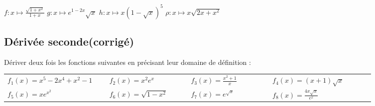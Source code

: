 \documentclass[oneside,12pt]{book}          %
\begin{document}
$f:x\mapsto\frac{\sqrt{1+x^2}}{1+x}$ \qquad $g:x\mapsto e^{1-2x}\sqrt{x}$ \qquad $h:x\mapsto x\left(1-\sqrt{x}\right)^5$ \qquad $\rho:x\mapsto x\sqrt{2x+x^2}$ 

\begin{sol}
\begin{minipage}{0.45\linewidth}
	
\end{minipage}\hfill
\begin{minipage}{0.45\linewidth}
	
\end{minipage}
\vspace{10pt}
\end{sol}



\subsection{Dérivée seconde\quad\small{(corrigé)}}
Dériver deux fois les fonctions suivantes en précisant leur domaine de définition :

\begin{tabular}{p{0.25\linewidth}p{0.2\linewidth}p{0.2\linewidth}p{0.25\linewidth}}
$f_1(x)=x^5-2x^4+x^2-1$ & $f_2(x)=x^2e^x$ & $f_3(x)=\frac{x^2+1}{x}$ & $f_4(x)=(x+1)\sqrt{x}$\\
$f_5(x)=xe^{x^2}$ & $f_6(x)=\sqrt{1-x^2}$ & $f_7(x)=e^{\sqrt{x}}$ & $f_8(x)=\frac{4x\sqrt{x}}{e^x}$
\end{tabular}
\end{document}
